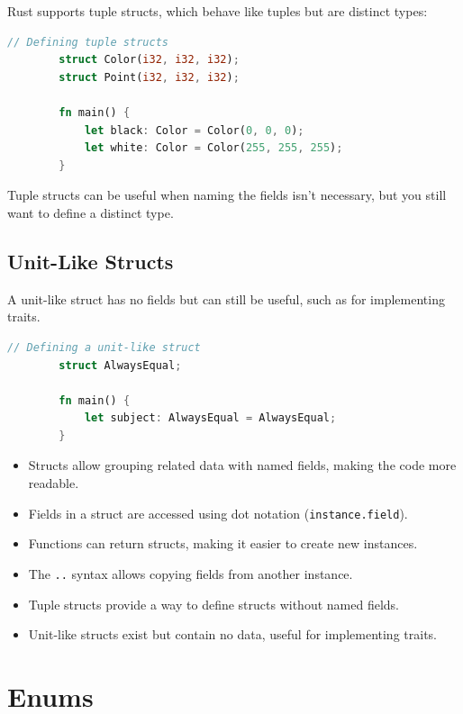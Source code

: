 \documentclass[a4paper,12pt]{report}
\begin{document}
	Rust supports tuple structs, which behave like tuples but are distinct types:
	
	\begin{lstlisting}[language=Rust]
		// Defining tuple structs
		struct Color(i32, i32, i32);
		struct Point(i32, i32, i32);
		
		fn main() {
			let black: Color = Color(0, 0, 0);
			let white: Color = Color(255, 255, 255);
		}
	\end{lstlisting}
	
	\noindent Tuple structs can be useful when naming the fields isn’t necessary, but you still want to define a distinct type.
	
	\subsection*{Unit-Like Structs}
	
	A unit-like struct has no fields but can still be useful, such as for implementing traits.
	
	\begin{lstlisting}[language=Rust]
		// Defining a unit-like struct
		struct AlwaysEqual;
		
		fn main() {
			let subject: AlwaysEqual = AlwaysEqual;
		}
	\end{lstlisting}
	
	\begin{takeawaybox}
	
		\begin{itemize}
			\item Structs allow grouping related data with named fields, making the code more readable.
			\item Fields in a struct are accessed using dot notation (\texttt{instance.field}).
			\item Functions can return structs, making it easier to create new instances.
			\item The \texttt{..} syntax allows copying fields from another instance.
			\item Tuple structs provide a way to define structs without named fields.
			\item Unit-like structs exist but contain no data, useful for implementing traits.
		\end{itemize}
	\end{takeawaybox}
	
	\section{Enums}
	
\end{document}
